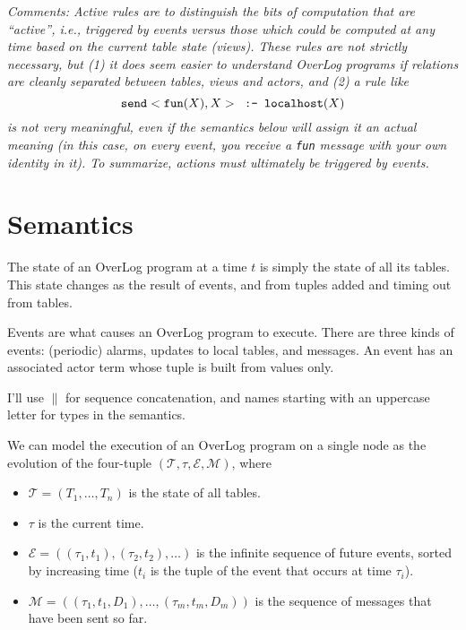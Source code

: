 \documentclass{article}
\newcommand{\code}[1]{{\tt \small #1}}
\newcommand{\T}{\mathcal{T}}
\newcommand{\E}{\mathcal{E}}
\newcommand{\M}{\mathcal{M}}
\newcommand{\imp}{\mbox{\tt \ :-\ }}
\begin{document}

\emph{Comments: Active rules are to distinguish the bits of computation that
are ``active'', i.e., triggered by events versus those which could be
computed at any time based on the current table state (views). These
rules are not strictly necessary, but (1) it does seem easier to understand
OverLog programs if relations are cleanly separated between tables,
views and actors,  and (2) a rule like \[\code{send}<\code{fun}(X), X> \imp \code{localhost}(X)\] is not very meaningful, even if the semantics below will assign it an
actual meaning (in this case, on every event, you receive a \code{fun}
message with your own identity in it). To summarize, actions must
ultimately be triggered by events.}

\section{Semantics}
\label{sec:semantics}

The state of an OverLog program at a time $t$ is simply the state of all
its tables. This state changes as the result of events, and from tuples
added and timing out from tables. 

Events are what causes an OverLog program to execute. There are three kinds of
events: (periodic) alarms, updates to local tables, and messages. An event has an associated actor term
whose tuple is built from values only.

I'll use $\parallel$ for sequence concatenation, and names starting with an
uppercase letter for types in the semantics.

We can model the execution of an OverLog program on a single node as the 
evolution of the four-tuple $(\T, \tau, \E, \M)$, where
\begin{itemize}
\item $\T = (T_1, \ldots, T_n)$ is the state of all tables.
\item $\tau$ is the current time.
\item $\E = ((\tau_1, t_1), (\tau_2, t_2), \ldots)$ is the infinite
sequence of future events, sorted by increasing time ($t_i$ is the tuple of
the event that occurs at time $\tau_i$).
\item $\M = ((\tau_1, t_1, D_1), \ldots, (\tau_m, t_m, D_m))$ is the sequence of
messages that have been sent so far.
\end{itemize}
\end{document}
